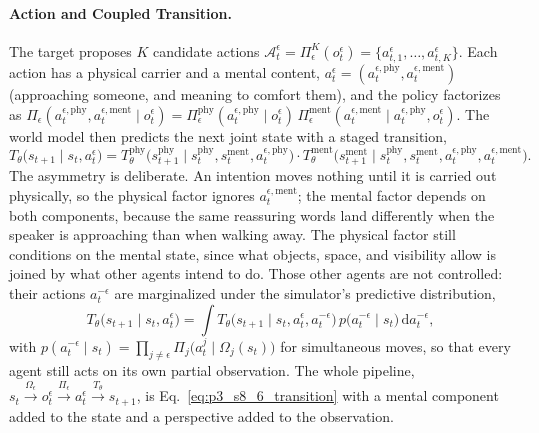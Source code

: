 \paragraph{Action and Coupled Transition.}
The target proposes $K$ candidate actions $\mathcal{A}_t^{\epsilon} = \Pi_{\epsilon}^{K}(o_t^{\epsilon}) = \{a^{\epsilon}_{t,1},\dots,a^{\epsilon}_{t,K}\}$. Each action has a physical carrier and a mental content, $a_t^{\epsilon} = (a_t^{\epsilon,\mathrm{phy}}, a_t^{\epsilon,\mathrm{ment}})$ (approaching someone, and meaning to comfort them), and the policy factorizes as $\Pi_{\epsilon}(a_t^{\epsilon,\mathrm{phy}}, a_t^{\epsilon,\mathrm{ment}} \mid o_t^{\epsilon}) = \Pi_{\epsilon}^{\mathrm{phy}}(a_t^{\epsilon,\mathrm{phy}} \mid o_t^{\epsilon})\,\Pi_{\epsilon}^{\mathrm{ment}}(a_t^{\epsilon,\mathrm{ment}} \mid a_t^{\epsilon,\mathrm{phy}}, o_t^{\epsilon})$. The world model then predicts the next joint state with a staged transition,
\begin{equation}
\label{eq:p3_s8_6_mwm_transition}
T_{\theta}\big(s_{t+1} \mid s_t, a_t^{\epsilon}\big) = T_{\theta}^{\mathrm{phy}}\big(s_{t+1}^{\mathrm{phy}} \mid s_t^{\mathrm{phy}}, s_t^{\mathrm{ment}}, a_t^{\epsilon,\mathrm{phy}}\big) \cdot T_{\theta}^{\mathrm{ment}}\big(s_{t+1}^{\mathrm{ment}} \mid s_t^{\mathrm{phy}}, s_t^{\mathrm{ment}}, a_t^{\epsilon,\mathrm{phy}}, a_t^{\epsilon,\mathrm{ment}}\big).
\end{equation}
The asymmetry is deliberate. An intention moves nothing until it is carried out physically, so the physical factor ignores $a_t^{\epsilon,\mathrm{ment}}$; the mental factor depends on both components, because the same reassuring words land differently when the speaker is approaching than when walking away. The physical factor still conditions on the mental state, since what objects, space, and visibility allow is joined by what other agents intend to do. Those other agents are not controlled: their actions $a_t^{-\epsilon}$ are marginalized under the simulator's predictive distribution,
\begin{equation}
\label{eq:p3_s8_6_mwm_marginal}
T_{\theta}\big(s_{t+1} \mid s_t, a_t^{\epsilon}\big) = \int T_{\theta}\big(s_{t+1} \mid s_t, a_t^{\epsilon}, a_t^{-\epsilon}\big)\, p\big(a_t^{-\epsilon} \mid s_t\big)\, \mathrm{d}a_t^{-\epsilon},
\end{equation}
with $p(a_t^{-\epsilon} \mid s_t) = \prod_{j\neq\epsilon} \Pi_j\big(a_t^{j} \mid \Omega_j(s_t)\big)$ for simultaneous moves, so that every agent still acts on its own partial observation. The whole pipeline, $s_t \xrightarrow{\Omega_{\epsilon}} o_t^{\epsilon} \xrightarrow{\Pi_{\epsilon}} a_t^{\epsilon} \xrightarrow{T_{\theta}} s_{t+1}$, is Eq.~\eqref{eq:p3_s8_6_transition} with a mental component added to the state and a perspective added to the observation.

